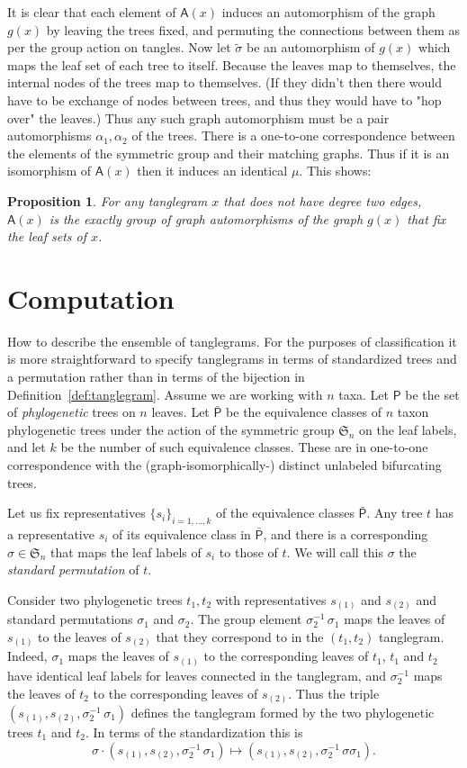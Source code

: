 \documentclass{amsart}
\newtheorem{proposition}[theorem]{Proposition}
\newcommand{\fS}{\mathfrak S}
\newcommand{\aut}{\mathsf A}
\newcommand{\ptree}{\mathsf{P}}
\newcommand{\ptequiv}{\bar{\ptree}}  %
\begin{document}
It is clear that each element of $\aut(x)$ induces an automorphism of the graph $g(x)$ by leaving the trees fixed, and permuting the connections between them as per the group action on tangles.
Now let $\tilde \sigma$ be an automorphism of $g(x)$ which maps the leaf set of each tree to itself.
Because the leaves map to themselves, the internal nodes of the trees map to themselves.
(If they didn't then there would have to be exchange of nodes between trees, and thus they would have to "hop over" the leaves.)
Thus any such graph automorphism must be a pair automorphisms $\alpha_1, \alpha_2$ of the trees.
There is a one-to-one correspondence between the elements of the symmetric group and their matching graphs.
Thus if it is an isomorphism of $\aut(x)$ then it induces an identical $\mu$.
This shows:
\begin{proposition}
For any tanglegram $x$ that does not have degree two edges, $\aut(x)$ is the exactly group of graph automorphisms of the graph $g(x)$ that fix the leaf sets of $x$.
\end{proposition}



\section{Computation}
How to describe the ensemble of tanglegrams.
For the purposes of classification it is more straightforward to specify tanglegrams in terms of standardized trees and a permutation rather than in terms of the bijection in Definition~\ref{def:tanglegram}.
Assume we are working with $n$ taxa.
Let $\ptree$ be the set of \emph{phylogenetic} trees on $n$ leaves.
Let $\ptequiv$ be the equivalence classes of $n$ taxon phylogenetic trees under the action of the symmetric group $\fS_n$ on the leaf labels, and let $k$ be the number of such equivalence classes.
These are in one-to-one correspondence with the (graph-isomorphically-) distinct unlabeled bifurcating trees.

Let us fix representatives $\{s_i\}_{i=1,\ldots,k}$ of the equivalence classes $\ptequiv$.
Any tree $t$ has a representative $s_i$ of its equivalence class in $\ptequiv$, and there is a corresponding $\sigma \in \fS_n$ that maps the leaf labels of $s_i$ to those of $t$.
We will call this $\sigma$ the \emph{standard permutation} of $t$.

Consider two phylogenetic trees $t_1, t_2$ with representatives $s_{(1)}$ and $s_{(2)}$ and standard permutations $\sigma_1$ and $\sigma_2$.
The group element $\sigma_2^{-1} \, \sigma_1$ maps the leaves of $s_{(1)}$ to the leaves of $s_{(2)}$ that they correspond to in the $(t_1, t_2)$ tanglegram.
Indeed, $\sigma_1$ maps the leaves of $s_{(1)}$ to the corresponding leaves of $t_1$, $t_1$ and $t_2$ have identical leaf labels for leaves connected in the tanglegram, and $\sigma_2^{-1}$ maps the leaves of $t_2$ to the corresponding leaves of $s_{(2)}$.
Thus the triple $(s_{(1)}, s_{(2)}, \sigma_2^{-1} \, \sigma_1)$ defines the tanglegram formed by the two phylogenetic trees $t_1$ and $t_2$.
In terms of the standardization this is
\[
\sigma \cdot (s_{(1)}, s_{(2)}, \sigma_2^{-1} \, \sigma_1) \mapsto (s_{(1)}, s_{(2)}, \sigma_2^{-1} \, \sigma \sigma_1).
\]
\end{document}

